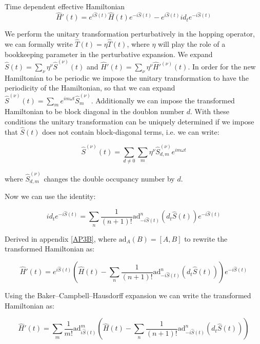 \begin{section}{Time dependent effective Hamiltonian}
\begin{equation}
\hat{H}'(t) = e^{i\hat{S}(t)} \hat{H}(t) e^{-i\hat{S}(t)} - e^{i\hat{S}(t)} id_t e^{-i\hat{S}(t)}
\end{equation} 

We perform the unitary transformation perturbatively in the hopping operator, we can formally write $\hat{T}(t) = \eta \hat{T}(t)$, where $\eta$ will play the role of a bookkeeping parameter in the perturbative expansion. We expand $\hat{S}(t) = \sum_\nu \eta^\nu \hat{S}^{(\nu)}(t)$ and $\hat{H}'(t) = \sum_\nu \eta^\nu \hat{H}'^{(\nu)}(t)$. In order for the new Hamiltonian to be periodic we impose the unitary transformation to have the periodicity of the Hamiltonian, so that we can expand $\hat{S}^{(\nu)}(t) = \sum_m e^{im\omega t}\hat{S}^{(\nu)}_m$. Additionally we can impose the transformed Hamiltonian to be block diagonal in the doublon number $d$. With these conditions the unitary transformation can be uniquely determined if we impose that $\hat{S}(t)$ does not contain block-diagonal terms, i.e. we can write:

\begin{equation}
\hat{S}^{(\nu)}(t) = \sum_{d \neq 0} \sum_m \eta^\nu \hat{S}^{(\nu)}_{d,m} e^{im\omega t}
\end{equation}

where $\hat{S}^{(\nu)}_{d,m}$ changes the double occupancy number by $d$.

Now we can use the identity:

\begin{equation}
id_t e^{-i\hat{S}(t)} = \sum_n \frac{1}{(n+1)!}\text{ad}_{-i\hat{S}(t)}^n (d_t \hat{S}(t))e^{-i\hat{S}(t)}
\end{equation}

Derived in appendix \ref{AP3B}, where $\text{ad}_A(B) = [A,B]$ to rewrite the transformed Hamiltonian as:

\begin{equation}
\hat{H}'(t) = e^{i\hat{S}(t)} \left( \hat{H}(t) - \sum_n \frac{1}{(n+1)!}\text{ad}_{-i\hat{S}(t)}^n (d_t \hat{S}(t)) \right) e^{-i\hat{S}(t)}
\end{equation}

Using the Baker–Campbell–Hausdorff expansion we can write the transformed Hamiltonian as:

\begin{equation}
\label{PertFull}
\hat{H}'(t) = \sum_m \frac{1}{m!} \text{ad}_{i\hat{S}(t)}^m \left( \hat{H}(t) - \sum_n \frac{1}{(n+1)!}\text{ad}_{-i\hat{S}(t)}^n (d_t \hat{S}(t)) \right)
\end{equation}


\end{section}
